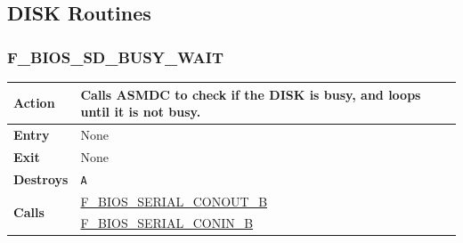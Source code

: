 \documentclass[a4paper,11pt]{article}
\begin{document}
    \subsection{DISK Routines}

        \subsubsection{F\_BIOS\_SD\_BUSY\_WAIT}
        \label{func:fbiossdbusywait}
        \begin{tabular}{l p{9cm}}
            \hline\textbf{Action}
            & Calls \textbf{ASMDC} to check if the \textbf{DISK} is busy, and
            loops until it is not busy. \\
            \hline\textbf{Entry} & None \\
            \hline\textbf{Exit} & None \\
            \hline\textbf{Destroys} & \texttt{A} \\
            \hline\multirow[t]{2}{4em}{\textbf{Calls}}
            & \hyperref[func:fbiosserialconoutb]{F\_BIOS\_SERIAL\_CONOUT\_B}\\
            & \hyperref[func:fbiosserialconinb]{F\_BIOS\_SERIAL\_CONIN\_B}\\
            \hline
        \end{tabular}

\end{document}
